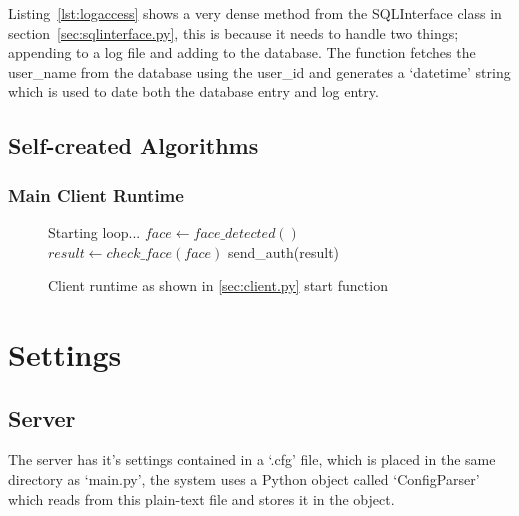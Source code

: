 \documentclass[12pt,a4paper]{report}
\begin{document}
        

        Listing~\ref{lst:logaccess} shows a very dense method from the SQLInterface class in section~\ref{sec:sqlinterface.py}, this is because it needs to handle two things;
        appending to a log file and adding to the database. The function fetches the user\_name from the database using the user\_id and generates a `datetime' string which is
        used to date both the database entry and log entry.
    \newpage
    \subsection{Self-created Algorithms}
        \subsubsection{Main Client Runtime}
        \begin{figure}[H]
        \caption{Client runtime as shown in \ref{sec:client.py} start function}
            \begin{algorithmic}
                \PRINT Starting loop...
                    \STATE $face\gets face\_detected()$
                        \STATE $result\gets check\_face(face)$
                            \STATE send\_auth(result)
                        \ENDIF
                    \ENDIF
                \ENDWHILE
            \end{algorithmic}
        \end{figure}


\section{Settings}
    \label{sec:settings}
    \subsection{Server}
    The server has it's settings contained in a `.cfg' file, which is placed in the same directory as `main.py',
    the system uses a Python object called `ConfigParser' which reads from this plain-text file and stores it in
    the object.
    
\end{document}

